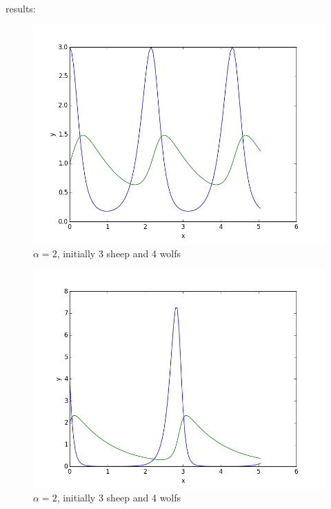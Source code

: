 results:


\begin{figure}[!ht]
\includegraphics[width=1\textwidth]{chapters/images/figure-7-15-1}
\caption{$\alpha = 2$, initially 3 sheep and 4 wolfs}
\end{figure}


\begin{figure}[!ht]
\includegraphics[width=1\textwidth]{chapters/images/figure-7-15-2}
\caption{$\alpha = 2$, initially 3 sheep and 4 wolfs}
\end{figure}


